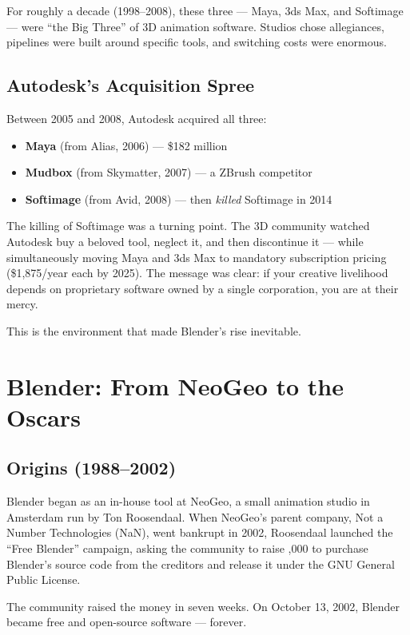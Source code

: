 \documentclass[11pt,letterpaper,twoside,openright]{book}
\begin{document}
For roughly a decade (1998--2008), these three --- Maya, 3ds Max, and Softimage --- were ``the Big Three'' of 3D animation software. Studios chose allegiances, pipelines were built around specific tools, and switching costs were enormous.

\subsection{Autodesk's Acquisition Spree}

Between 2005 and 2008, Autodesk acquired all three:

\begin{itemize}[leftmargin=2em]
  \item \textbf{Maya} (from Alias, 2006) --- \$182 million
  \item \textbf{Mudbox} (from Skymatter, 2007) --- a ZBrush competitor
  \item \textbf{Softimage} (from Avid, 2008) --- then \textit{killed} Softimage in 2014
\end{itemize}

The killing of Softimage was a turning point. The 3D community watched Autodesk buy a beloved tool, neglect it, and then discontinue it --- while simultaneously moving Maya and 3ds Max to mandatory subscription pricing (\$1,875/year each by 2025). The message was clear: if your creative livelihood depends on proprietary software owned by a single corporation, you are at their mercy.

This is the environment that made Blender's rise inevitable.

\section{Blender: From NeoGeo to the Oscars}

\subsection{Origins (1988--2002)}

Blender began as an in-house tool at NeoGeo, a small animation studio in Amsterdam run by Ton Roosendaal. When NeoGeo's parent company, Not a Number Technologies (NaN), went bankrupt in 2002, Roosendaal launched the ``Free Blender'' campaign, asking the community to raise ,000 to purchase Blender's source code from the creditors and release it under the GNU General Public License.

The community raised the money in seven weeks. On October 13, 2002, Blender became free and open-source software --- forever.
\end{document}
